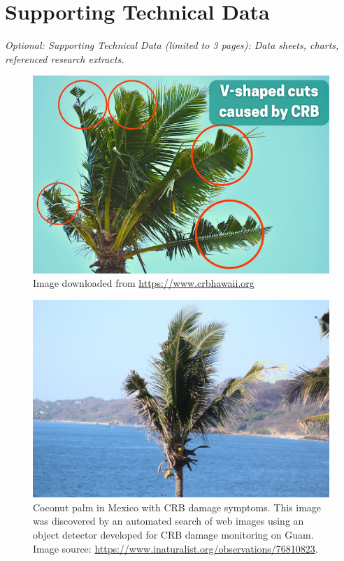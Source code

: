 \documentclass[11pt,english,letterpaper]{scrartcl}
\begin{document}
\clearpage
\section{Supporting Technical Data}

\textit{Optional: Supporting Technical Data (limited to 3 pages): Data sheets, charts, referenced research extracts.} \\

\begin{figure}[H]
	\centering
	\includegraphics[width=0.7\linewidth]{images/vcuts}
	\caption{Image downloaded from \url{https://www.crbhawaii.org}}
	\label{fig:vcuts}
\end{figure}

\begin{figure}[H]
	\centering
	\includegraphics[width=0.7\linewidth]{images/crb-mexico}
	\caption{Coconut palm in Mexico with CRB damage symptoms. This image was discovered by an automated search of web images using an object detector developed for CRB damage monitoring on Guam. Image source: \url{https://www.inaturalist.org/observations/76810823}.}	
	\label{fig:crb-mexico}
\end{figure}
\end{document}
